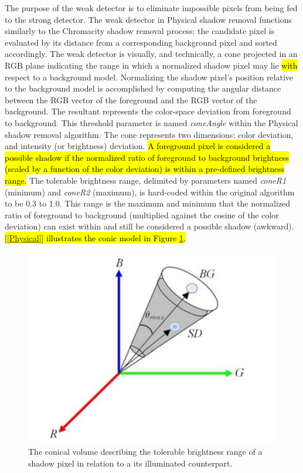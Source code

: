 \documentclass[12pt]{report}
\begin{document}
The purpose of the weak detector is to eliminate impossible pixels from being fed to the strong detector. The weak detector in Physical shadow removal functions similarly to the Chromacity shadow removal process; the candidate pixel is evaluated by its distance from a corresponding background pixel and sorted accordingly. The weak detector is visually, and technically, a cone projected in an RGB plane indicating the range in which a normalized shadow pixel may lie \hl{with} respect to a background model. Normalizing the shadow pixel's position relative to the background model is accomplished by computing the angular distance between the RGB vector of the foreground and the RGB vector of the background. The resultant represents the color-space deviation from foreground to background. This threshold parameter is named \textit{coneAngle} within the Physical shadow removal algorithm. The cone represents two dimensions: color deviation, and intensity (or brightness) deviation. \hl{A foreground pixel is considered a possible shadow if the normalized ratio of foreground to background brightness (scaled by a function of the color deviation) is within a pre-defined brightness range.} The tolerable brightness range, delimited by parameters named \textit{coneR1} (minimum) and \textit{coneR2} (maximum), is hard-coded within the original algorithm to be 0.3 to 1.0. This range is the maximum and minimum that the normalized ratio of foreground to background (multiplied against the cosine of the color deviation) can exist within and still be considered a possible shadow (awkward). \hl{[\ref{Physical}] illustrates the conic model in Figure \ref{fig:cone_physical}.}

\begin{figure}
  \centering
  \includegraphics[width=.7\linewidth]{figures/cone_physical.jpg}
  \caption{The conical volume describing the tolerable brightness range of a shadow pixel in relation to a its illuminated counterpart.}
  \label{fig:cone_physical}
\end{figure}
\end{document}
